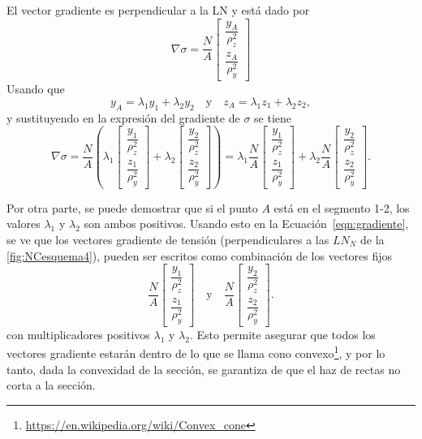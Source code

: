 El vector gradiente es perpendicular a la LN y está dado por
$$
\nabla \sigma = \frac{N}{A} \left[ \begin{array}{c}
\displaystyle \dfrac{y_A}{\rho_z^2} \\[3mm]
\displaystyle \dfrac{z_A}{\rho_y^2}
\end{array} \right]
$$
Usando que 
$$
 y_A = \lambda_1 y_1 + \lambda_2 y_2 \quad \text{y} \quad 
 z_A = \lambda_1 z_1 + \lambda_2 z_2,
$$
y sustituyendo en la expresión del gradiente de $\sigma$ se tiene
%
\begin{equation}\label{eqn:gradiente}
\nabla \sigma = \frac{N}{A} \left( \lambda_1 \left[ \begin{array}{c}
\displaystyle \dfrac{y_1}{\rho_z^2} \\[3mm]
\displaystyle \dfrac{z_1}{\rho_y^2}
\end{array} \right]
+
\lambda_2 \left[ \begin{array}{c}
\displaystyle \dfrac{y_2}{\rho_z^2} \\[3mm]
\displaystyle \dfrac{z_2}{\rho_y^2}
\end{array} \right]
\right)
= 
\lambda_1 \frac{N}{A} \left[ \begin{array}{c}
\displaystyle \dfrac{y_1}{\rho_z^2} \\[3mm]
\displaystyle \dfrac{z_1}{\rho_y^2}
\end{array} \right]
+
\lambda_2 \frac{N}{A} \left[ \begin{array}{c}
\displaystyle \dfrac{y_2}{\rho_z^2} \\[3mm]
\displaystyle \dfrac{z_2}{\rho_y^2}
\end{array} \right].
\end{equation}


Por otra parte, se puede demostrar que si el punto $A$ está en el segmento 1-2, los valores $\lambda_1$ y $\lambda_2$ son ambos positivos. %
%
Usando esto en la Ecuación~\eqref{eqn:gradiente}, se ve que los vectores gradiente de tensión (perpendiculares a las $LN_N$ de la \autoref{fig:NCesquema4}), pueden ser escritos como combinación de los vectores fijos
$$
 \frac{N}{A} \left[ \begin{array}{c}
\displaystyle \dfrac{y_1}{\rho_z^2} \\[3mm]
\displaystyle \dfrac{z_1}{\rho_y^2}
\end{array} \right]
\quad \text{y} \quad 
 \frac{N}{A} \left[ \begin{array}{c}
\displaystyle \dfrac{y_2}{\rho_z^2} \\[3mm]
\displaystyle \dfrac{z_2}{\rho_y^2}
\end{array} \right].
$$
con multiplicadores positivos $\lambda_1$ y $\lambda_2$. Esto permite asegurar que todos los vectores gradiente estarán dentro de lo que se llama cono convexo\footnote{\href{https://en.wikipedia.org/wiki/Convex_cone}{https://en.wikipedia.org/wiki/Convex\_cone}}, y por lo tanto, dada la convexidad de la sección, se garantiza de que el haz de rectas no corta a la sección.

